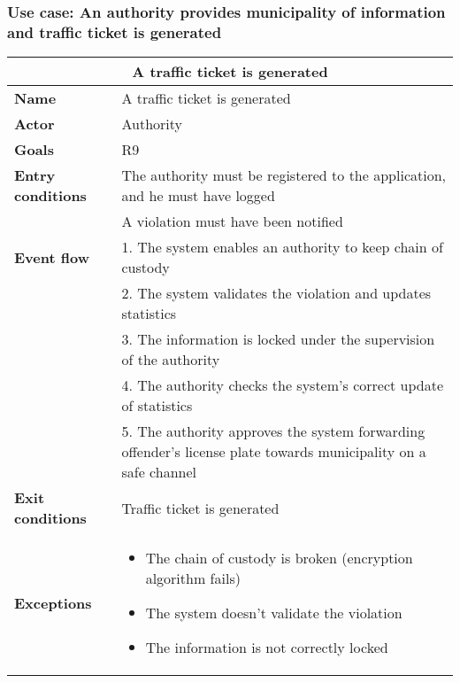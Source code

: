 \subsubsection{Use case: An authority provides municipality of information and traffic ticket is generated}
\begin{center}
    \begin{tabular}{|p{3cm}|p{7cm}|}
        \multicolumn{2}{c}{\textbf{A traffic ticket is generated}} \\
        \hline
        \textbf{Name} & A traffic ticket is generated \\
        \hline
        \textbf{Actor} & Authority \\
        \hline
        \textbf{Goals} & R9 \\
        \hline
        \textbf{Entry conditions} & The authority must be registered to the application, and he must have logged  \\
        & A violation must have been notified \\
        \hline
        \textbf{Event flow} & 1. The system enables an authority to keep chain of custody \\ 
        & 2. The system validates the violation and updates statistics\\ 
        & 3. The information is locked under the supervision of the authority \\
        & 4. The authority checks the system's correct update of statistics \\
        & 5. The authority approves the system forwarding offender's license plate towards municipality on a safe channel \\ 
        \hline
        \textbf{Exit conditions} & Traffic ticket is generated \\
        \hline
        \textbf{Exceptions}
        & \begin{itemize}
            \item The chain of custody is broken (encryption algorithm fails)
            \item The system doesn't validate the violation
            \item The information is not correctly locked 
        \end{itemize} \\
        \hline
    \end{tabular}
\end{center}